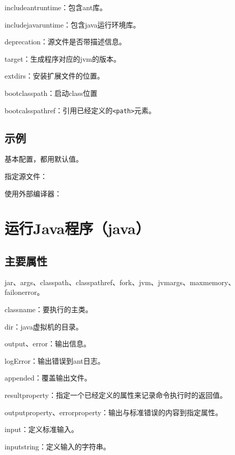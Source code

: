 includeantruntime：包含ant库。

includejavaruntime：包含java运行环境库。

deprecation：源文件是否带描述信息。

target：生成程序对应的jvm的版本。

extdirs：安装扩展文件的位置。

bootclasspath：启动class位置

bootcalsspathref：引用已经定义的\verb|<path>|元素。

\subsection{示例}

基本配置，都用默认值。



指定源文件：



使用外部编译器：







\section{运行Java程序（java）}

\subsection{主要属性}

jar、args、classpath、classpathref、fork、jvm、jvmargs、maxmemory、failonerror。

classname：要执行的主类。

dir：java虚拟机的目录。

output、error：输出信息。

logError：输出错误到ant日志。

appended：覆盖输出文件。

resultproperty：指定一个已经定义的属性来记录命令执行时的返回值。

outputproperty、errorproperty：输出与标准错误的内容到指定属性。

input：定义标准输入。

inputstring：定义输入的字符串。


